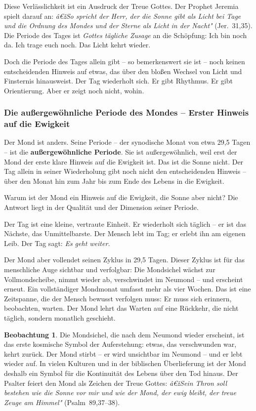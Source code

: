 ﻿\documentclass[a4paper,12pt]{article}
\theoremstyle{definition}
\newtheorem{observation}{Beobachtung}[section]
\begin{document}
Diese Verlässlichkeit ist ein Ausdruck der Treue Gottes. Der Prophet Jeremia spielt
darauf an: \textit{â€žSo spricht der Herr, der die Sonne gibt als Licht bei Tage und
	die Ordnung des Mondes und der Sterne als Licht in der Nacht"}
(Jer.~31,35). Die Periode des Tages ist \textit{Gottes tägliche Zusage} an die
Schöpfung: Ich bin noch da. Ich trage euch noch. Das Licht kehrt wieder.

Doch die Periode des Tages allein gibt -- so bemerkenswert sie ist -- noch keinen
entscheidenden Hinweis auf etwas, das über den bloßen Wechsel von Licht und
Finsternis hinausweist. Der Tag wiederholt sich. Er gibt Rhythmus. Er gibt
Orientierung. Aber er zeigt noch nicht, wohin.

\subsubsection{Die außergewöhnliche Periode des Mondes -- Erster Hinweis auf die Ewigkeit}

Der Mond ist anders. Seine Periode -- der synodische Monat von etwa 29,5 Tagen --
ist die \textbf{außergewöhnliche Periode}. Sie ist außergewöhnlich, weil erst
der Mond der erste klare Hinweis auf die Ewigkeit ist. Das ist die Sonne nicht.
Der Tag allein in seiner Wiederholung gibt noch nicht den entscheidenden Hinweis
-- über den Monat hin zum Jahr bis zum Ende des Lebens in die Ewigkeit.

Warum ist der Mond ein Hinweis auf die Ewigkeit, die Sonne aber nicht? Die
Antwort liegt in der Qualität und der Dimension seiner Periode.

Der Tag ist eine kleine, vertraute Einheit. Er wiederholt sich täglich -- er ist
das Nächste, das Unmittelbarste. Der Mensch lebt im Tag; er erlebt ihn am eigenen
Leib. Der Tag sagt: \textit{Es geht weiter.}

Der Mond aber vollendet seinen Zyklus in 29,5 Tagen. Dieser Zyklus ist für das
menschliche Auge sichtbar und verfolgbar: Die Mondsichel wächst zur Vollmond\-scheibe,
nimmt wieder ab, verschwindet im Neumond -- und erscheint erneut. Ein vollständiger
Mondmonat umfasst mehr als vier Wochen. Das ist eine Zeitspanne, die der Mensch
bewusst verfolgen muss: Er muss sich erinnern, beobachten, warten. Der Mond lehrt
das Warten auf eine Rückkehr, die nicht täglich, sondern monatlich geschieht.

\begin{observation}
	Die Mondsichel, die nach dem Neumond wieder erscheint, ist das erste kosmische
	Symbol der Auferstehung: etwas, das verschwunden war, kehrt zurück. Der Mond
	stirbt -- er wird unsichtbar im Neumond -- und er lebt wieder auf. In vielen
	Kulturen und in der biblischen Überlieferung ist der Mond deshalb ein Symbol
	für die Kontinuität des Lebens über den Tod hinaus. Der Psalter feiert den
	Mond als Zeichen der Treue Gottes: \textit{â€žSein Thron soll bestehen wie die
		Sonne vor mir und wie der Mond, der ewig bleibt, der treue Zeuge am Himmel"}
	(Psalm~89,37--38).
\end{observation}
\end{document}
